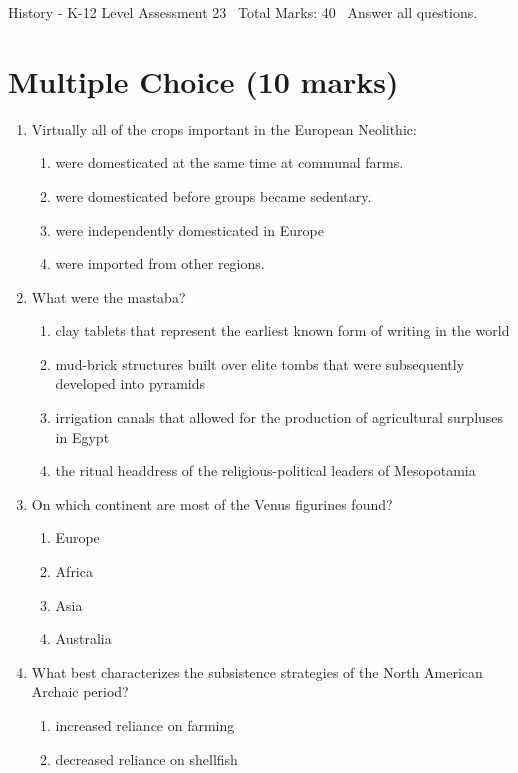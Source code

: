\documentclass[12pt]{article}
\begin{document}
\begin{center}
History - K-12 Level Assessment 23 \
Total Marks: 40 \
Answer all questions.
\end{center}

\section*{Multiple Choice (10 marks)}
\begin{enumerate}[label=\arabic*.]
\item Virtually all of the crops important in the European Neolithic:
\begin{enumerate}[label=(\alph*)]
    \item were domesticated at the same time at communal farms.
    \item were domesticated before groups became sedentary.
    \item were independently domesticated in Europe
    \item were imported from other regions.
\end{enumerate}
\item What were the mastaba?
\begin{enumerate}[label=(\alph*)]
    \item clay tablets that represent the earliest known form of writing in the world
    \item mud-brick structures built over elite tombs that were subsequently developed into pyramids
    \item irrigation canals that allowed for the production of agricultural surpluses in Egypt
    \item the ritual headdress of the religious-political leaders of Mesopotamia
\end{enumerate}
\item On which continent are most of the Venus figurines found?
\begin{enumerate}[label=(\alph*)]
    \item Europe
    \item Africa
    \item Asia
    \item Australia
\end{enumerate}
\item What best characterizes the subsistence strategies of the North American Archaic period?
\begin{enumerate}[label=(\alph*)]
    \item increased reliance on farming
    \item decreased reliance on shellfish

\end{enumerate}
\end{enumerate}
\end{document}
